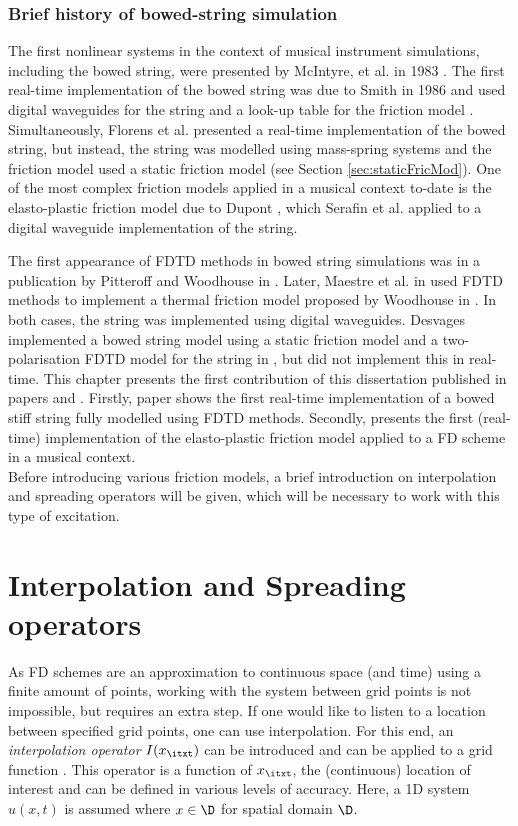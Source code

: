 \subsubsection{Brief history of bowed-string simulation}
The first nonlinear systems in the context of musical instrument simulations, including the bowed string, were presented by McIntyre, et al. in 1983 \cite{McIntyre1983}. The first real-time implementation of the bowed string was due to Smith in 1986 and used digital waveguides for the string and a look-up table for the friction model \cite{Smith1986}. Simultaneously, Florens et al. presented a real-time implementation of the bowed string, but instead, the string was modelled using mass-spring systems and the friction model used a static friction model \cite{Florens1986} (see Section \ref{sec:staticFricMod}). One of the most complex friction models applied in a musical context to-date is the elasto-plastic friction model due to Dupont \cite{Dupont2002}, which Serafin et al. \cite{Serafin2003, Serafin2004} applied to a digital waveguide implementation of the string. 

The first appearance of FDTD methods in bowed string simulations was in a publication by Pitteroff and Woodhouse in \cite{Pitteroff1998}. Later, Maestre et al. in \cite{Maestre2014} used FDTD methods to implement a thermal friction model proposed by Woodhouse in \cite{Woodhouse2003}. In both cases, the string was implemented using digital waveguides. Desvages implemented a bowed string model using a static friction model and a two-polarisation FDTD model for the string in \cite{Desvages2016, Desvages2018}, but did not implement this in real-time. This chapter presents the first contribution of this dissertation published in papers \citeP[A] and \citeP[C]. Firstly, paper \citeP[A] shows the first real-time implementation of a bowed stiff string fully modelled using FDTD methods. Secondly, \citeP[C] presents the first (real-time) implementation of the elasto-plastic friction model applied to a FD scheme in a musical context.
\\

Before introducing various friction models, a brief introduction on interpolation and spreading operators will be given, which will be necessary to work with this type of excitation.

\section{Interpolation and Spreading operators}\label{sec:interpolationSpreading}
As FD schemes are an approximation to continuous space (and time) using a finite amount of points, working with the system between grid points is not impossible, but requires an extra step. If one would like to listen to a location between specified grid points, one can use interpolation. For this end, an \textit{interpolation operator} $I(x_\itxt)$ can be introduced and can be applied to a grid function \cite{theBible}.  This operator is a function of $x_\itxt$, the (continuous) location of interest and can be defined in various levels of accuracy. Here, a 1D system $u(x,t)$ is assumed where $x\in \D$ for spatial domain $\D$.

